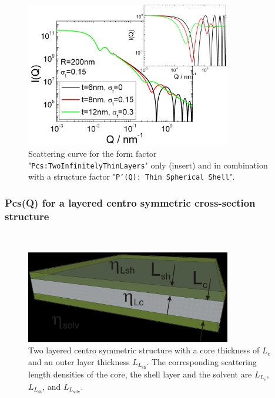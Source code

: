 \begin{figure}[htb]
\begin{center}
\includegraphics[width=0.8\textwidth,height=0.55\textwidth]{../images/form_factor/anisotropic/planar2thinIQ.png}
\end{center}
\caption{Scattering curve for the form factor "\texttt{Pcs:TwoInfinitelyThinLayers}" only (insert) and
in combination with a structure factor "\texttt{P'(Q): Thin Spherical Shell}".}
\label{fig_IQ:Pcs:TwoInfinitelyThinLayers}
\end{figure}


\clearpage
\subsubsection{Pcs(Q) for a layered centro symmetric cross-section structure} ~\\
\label{plugin:Pcs:LayeredCentroSymmetricCrossSectionStructure}

\begin{figure}[htb]
\begin{center}
\includegraphics[width=0.8\textwidth,height=0.361\textwidth]{../images/form_factor/anisotropic/planar2centrosymm_txt.png}
\end{center}
\caption{Two layered centro symmetric structure with a core thickness of $L_\textrm{c}$ and an outer layer thickness
$L_{L_\textrm{sh}}$. The corresponding scattering length densities of the core, the shell layer and the solvent are
$L_{L_\textrm{c}}$, $L_{L_\textrm{sh}}$, and $L_{L_\textrm{solv}}$.}
\label{fig:Pcs:LayeredCentroSymmetricCrossSection}
\end{figure}

